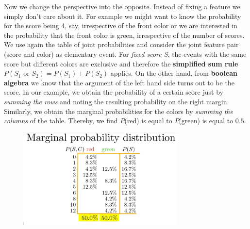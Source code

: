 \documentclass[12pt, a4paper]{scrartcl}
\begin{document}
Now we change the perspective into the opposite. Instead of fixing a feature we simply don’t care about it.
For example we might want to know the probability for the score being 4, say, irrespective of the front color or we are interested in the probability that the front color is green, irrespective of the number of scores.
We use again the table of joint probabilities and consider the joint feature pair (score and color) as elementary event. 
For \textit{fixed score S}, the events with the same score but different colors are exclusive and therefore the \textbf{simplified sum rule} $P(S_1 \text{ or } S_2)=P(S_1)+P(S_2)$ applies. %
On the other hand, from \textbf{boolean algebra} we know that the argument of the left hand side turns out to be the score. 
In our example, we obtain the probability of a certain score just by \textit{summing the rows} and noting the resulting probability on the right margin.
Similarly, we obtain the marginal probabilities for the colors by \textit{summing the columns} of the table.
Thereby, we find  $P$(red) is equal to $P$(green) is equal to $0.5$. %
\begin{figure}[H]
	\centering
	\includegraphics[width=0.75\textwidth]{3_7.png}
\end{figure}

\\
\end{document}
